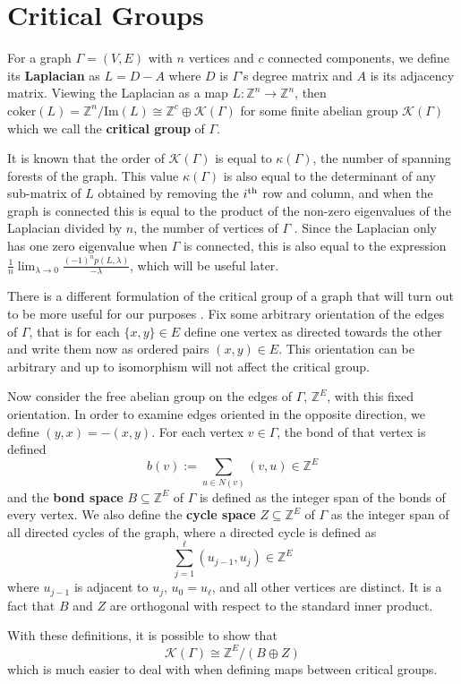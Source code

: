 \documentclass[12pt]{report}
\theoremstyle{definition}
\def\ZZ{{\mathbb Z}}
\begin{document}
\chapter{Critical Groups}
For a graph $\Gamma=(V,E)$ with $n$ vertices and $c$ connected components, we define its \textbf{Laplacian} as $L=D-A$ where $D$ is $\Gamma$'s degree matrix and $A$ is its adjacency matrix. Viewing the Laplacian as a map $L:\ZZ^n\to \ZZ^n$, then $\text{coker}(L) = \ZZ^n/\text{Im}(L)\cong \ZZ^c \oplus \mathcal{K}(\Gamma)$ for some finite abelian group $\mathcal{K}(\Gamma)$ which we call the \textbf{critical group} of $\Gamma$.\par
It is known that the order of $\mathcal{K}(\Gamma)$ is equal to $\kappa(\Gamma)$, the number of spanning forests of the graph. This value $\kappa(\Gamma)$ is also equal to the determinant of any sub-matrix of $L$ obtained by removing the $i^{\textnormal{th}}$ row and column, and when the graph is connected this is equal to the product of the non-zero eigenvalues of the Laplacian divided by $n$, the number of vertices of $\Gamma$ \cite[Proposition 1.3.4]{haemers}. Since the Laplacian only has one zero eigenvalue when $\Gamma$ is connected, this is also equal to the expression $\frac{1}{n}\lim_{\lambda \to 0}\frac{(-1)^np(L,\lambda)}{-\lambda}$, which will be useful later.\par
There is a different formulation of the critical group of a graph that will turn out to be more useful for our purposes \cite[p. 319]{godsilbook}. Fix some arbitrary orientation of the edges of $\Gamma$, that is for each $\{x,y\} \in E$ define one vertex as directed towards the other and write them now as ordered pairs $(x,y)\in E$. This orientation can be arbitrary and up to isomorphism will not affect the critical group. \par
Now consider the free abelian group on the edges of $\Gamma$, $\ZZ^E$, with this fixed orientation. In order to examine edges oriented in the opposite direction, we define $(y,x)=-(x,y)$. For each vertex $v\in \Gamma$, the bond of that vertex is defined
\[b(v):=\sum_{u\in N(v)}(v,u)\in \ZZ^E\]
and the \textbf{bond space} $B\subseteq \ZZ^E$ of $\Gamma$ is defined as the integer span of the bonds of every vertex. We also define the \textbf{cycle space} $Z \subseteq \ZZ^E$ of $\Gamma$ as the integer span of all directed cycles of the graph, where a directed cycle is defined as
\[\sum_{j=1}^\ell(u_{j-1}, u_j) \in \ZZ^E\] where $u_{j-1}$ is adjacent to $u_j$, $u_0=u_\ell$, and all other vertices are distinct. It is a fact that $B$ and $Z$ are orthogonal with respect to the standard inner product.\par
With these definitions, it is possible to show that
\begin{equation}\label{eq:critical}\mathcal{K}(\Gamma)\cong \ZZ^E/(B\oplus Z)\end{equation}
which is much easier to deal with when defining maps between critical groups.
\end{document}
